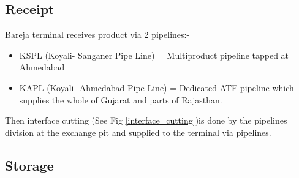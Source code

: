 \documentclass{report}
\begin{document}
	\subsection{Receipt}
	Bareja terminal receives product via 2 pipelines:-
	\begin{itemize}
		\item KSPL (Koyali- Sanganer Pipe Line) = Multiproduct pipeline tapped at Ahmedabad
		\item KAPL (Koyali- Ahmedabad Pipe Line) = Dedicated ATF pipeline which supplies the whole of Gujarat and parts of Rajasthan.
	\end{itemize}
	Then interface cutting (See Fig \ref{interface_cutting})is done by the pipelines division at the exchange pit and supplied to the terminal via pipelines. 
	\subsection{Storage}
\end{document}
